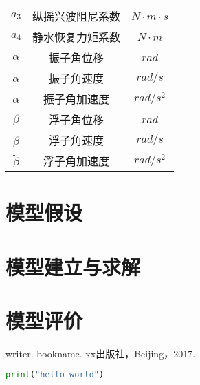 \documentclass{cumcmthesis}
\begin{document}
\begin{center}
\begin{tabular}{ccc}
			$a_3$		&   纵摇兴波阻尼系数   &   $ N \cdot m \cdot s $\\
			$a_4$		&   静水恢复力矩系数   &   $ N \cdot m $ \\  
			$\alpha$    &	振子角位移		  &   $ rad $ \\
			$\dot{\alpha}$& 振子角速度		  &   $ rad/s $ \\ 
			$\ddot{\alpha}$&振子角加速度		 &   $ rad/s^2 $ \\ 
			$\beta$     &   浮子角位移		  &   $ rad $  \\
			$\dot{\beta}$&  浮子角速度		  &   $ rad/s $ \\ 
			$\ddot{\beta}$& 浮子角加速度		 &   $ rad/s^2 $ \\ 
			\hline
		\end{tabular}
	\end{center}
	

	\section{模型假设}
	
	
	\section{模型建立与求解}
	
	
	\section{模型评价}
	

	\newpage
	\begin{thebibliography}{9} %
		writer.
		\newblock bookname\allowbreak [J].
		\newblock xx出版社，Beijing，2017.
	\end{thebibliography}
	\begin{appendices}  
		\begin{lstlisting}[language={python}]  
			print("hello world")
		\end{lstlisting}  %
	\end{appendices}
\end{document}
